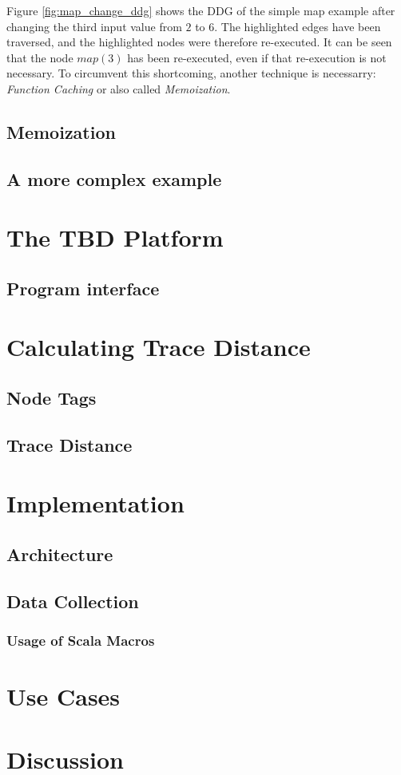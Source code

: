 Figure \ref{fig:map_change_ddg} shows the DDG of the simple map example after changing the third input value from $2$ to $6$. The highlighted edges have been traversed, and the highlighted nodes were therefore re-executed. It can be seen that the node $map(3)$ has been re-executed, even if that re-execution is not necessary. To circumvent this shortcoming, another technique is necessarry: \textit{Function Caching} or also called \textit{Memoization}.

\section{Memoization}

\section{A more complex example}

\chapter{The TBD Platform}
\label{ch:tbd_platform}

\section{Program interface}

\chapter{Calculating Trace Distance}
\label{ch:implementation}

\section{Node Tags}

\section{Trace Distance}

\chapter{Implementation}
\label{ch:impl}

\section{Architecture}

\section{Data Collection}

\subsection{Usage of Scala Macros}

\chapter{Use Cases}
\label{ch:use_cases}

\chapter{Discussion}
\label{ch:discussion}